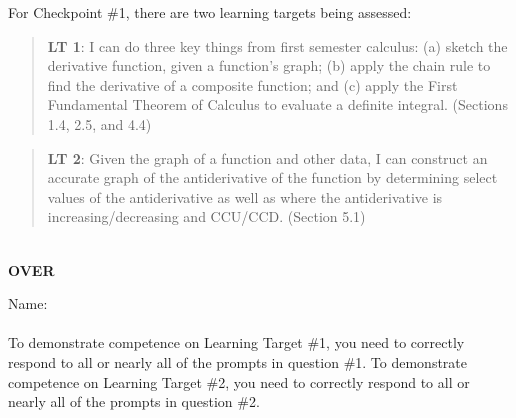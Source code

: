 \documentclass[11 pt]{article}
\begin{document}
 For Checkpoint \#1, there are two learning targets being assessed: 

\begin{quote}
{\bf LT 1}: I can do three key things from first semester calculus: (a) sketch the derivative function, given a function’s graph; (b) apply the chain rule to find the derivative of a composite function; and (c) apply the First Fundamental Theorem of Calculus to evaluate a definite integral. (Sections 1.4, 2.5, and 4.4)
\end{quote}

\begin{quote}
{\bf LT 2}: Given the graph of a function and other data, I can construct an accurate graph of the antiderivative of the function by determining select values of the antiderivative as well as where the antiderivative is increasing/decreasing and CCU/CCD.
(Section 5.1)
\end{quote}

\noindent \hrulefill \\

\vfill \hfill {\bf OVER} 

\pagebreak

\noindent Name: \\ \ \\

\noindent To demonstrate competence on Learning Target \#1, you need to correctly respond to all or nearly all of the prompts in question \#1.  To demonstrate competence on Learning Target \#2, you need to correctly respond to all or nearly all of the prompts in question \#2.
\end{document}
